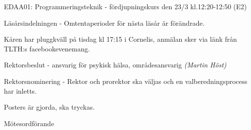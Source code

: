 \documentclass[10pt]{article}
\def\mo{Pontus Landgren}
\begin{document}
\begin{paragrafer}
EDAA01: Programmeringsteknik - fördjupningskurs
den 23/3 kl.12:20-12:50 (E2)

\item Läsårsindelningen - Omtentaperioder för nästa läsår är förändrade.

\item Kåren har pluggkväll på tisdag kl 17:15 i Cornelis, anmälan sker via länk från TLTH:s facebookevenemang.

\item Rektorsbeslut - ansvarig för psykisk hälsa, områdesansvarig \textit{(Martin Höst)}

\item Rektorsnominering - Rektor och prorektor ska väljas och en valberedningsprocess har inletts.


Posters är gjorda, ska tryckas.
\end{paragrafer}

\hidesignfoot
\begin{signatures}{1}
\signature{\mo}{Mötesordförande}
\end{signatures}
\end{document}
